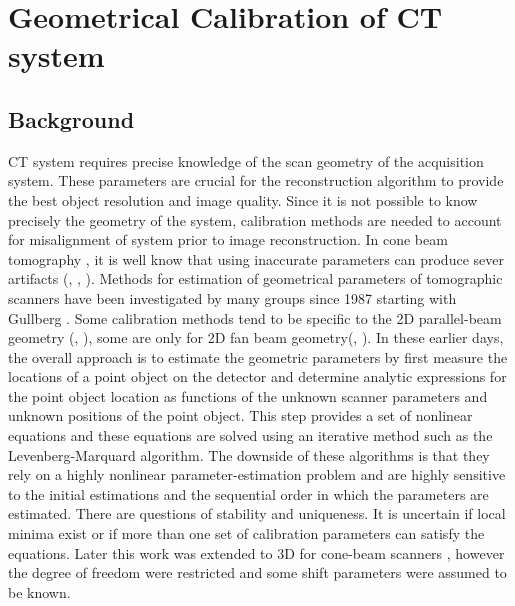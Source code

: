 \chapter{Geometrical Calibration of CT system}
\section{Background}
CT system requires precise knowledge of the scan geometry of the acquisition system.  These parameters are crucial for the reconstruction algorithm to provide the best object resolution and image quality.  Since it is not possible to know precisely the geometry of the system, calibration methods are needed to account for misalignment of system prior to image reconstruction.  In cone beam tomography , it is well know that using inaccurate parameters can produce sever artifacts (\citep{Li1994a}, \citep{Li1994b}, \citep{Wang1998}). Methods for estimation of geometrical parameters of tomographic scanners have been investigated by many groups since 1987 starting with Gullberg \citep{Gullberg1987}.  Some calibration methods tend to be specific to the 2D parallel-beam geometry (\citep{Azevedo1990}, \citep{Busemann1987}), some are only for 2D fan beam geometry(\citep{Crawford1988}, \citep{Hsieh1999} \citep{Gullberg1987}).  In these earlier days, the overall approach is to estimate the geometric parameters by first measure the locations of a point object on the detector and determine analytic expressions for the point object location as functions of the unknown scanner parameters and unknown positions of the point object.  This step provides a set of nonlinear equations and these equations are solved using an iterative method such as the Levenberg-Marquard algorithm.  The downside of these algorithms is that they rely on a highly nonlinear parameter-estimation problem and are highly sensitive to the initial estimations and the sequential order in which the parameters are estimated.  There are questions of stability and uniqueness.  It is uncertain if local minima exist or if more than one set of calibration parameters can satisfy the equations.  Later this work was extended to 3D for cone-beam scanners \citep{Gullberg1990}, however the degree of freedom were restricted and some shift parameters were assumed to be known.


